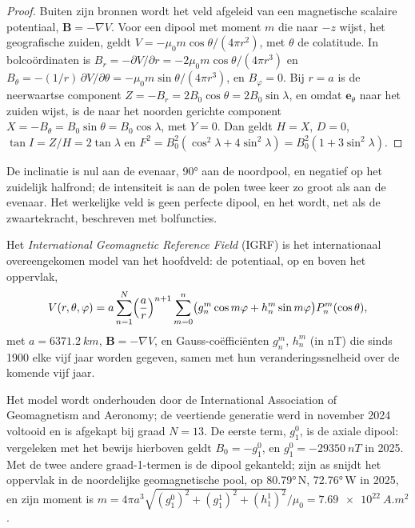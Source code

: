 \begin{proof}
Buiten zijn bronnen wordt het veld afgeleid van een magnetische scalaire potentiaal,
$\mathbf B = -\nabla V$. Voor een dipool met moment $m$ die naar $-z$ wijst, het
geografische zuiden, geldt $V = -\mu_0 m\cos\theta/(4\pi r^2)$, met $\theta$ de
colatitude. In bolcoördinaten is $B_r = -\partial V/\partial r =
-2\mu_0 m\cos\theta/(4\pi r^3)$ en $B_\theta = -(1/r)\,\partial V/\partial\theta =
-\mu_0 m\sin\theta/(4\pi r^3)$, en $B_\varphi = 0$. Bij $r = a$ is de neerwaartse
component $Z = -B_r = 2B_0\cos\theta = 2B_0\sin\lambda$, en omdat
$\mathbf e_\theta$ naar het zuiden wijst, is de naar het noorden gerichte component $X = -B_\theta =
B_0\sin\theta = B_0\cos\lambda$, met $Y = 0$. Dan geldt $H = X$, $D = 0$, $\tan I =
Z/H = 2\tan\lambda$ en $F^2 = B_0^2(\cos^2\lambda + 4\sin^2\lambda) =
B_0^2(1 + 3\sin^2\lambda)$.
\end{proof}

De inclinatie is nul aan de evenaar, \ang{90} aan de noordpool, en
negatief op het zuidelijk halfrond; de intensiteit is aan de polen
twee keer zo groot als aan de evenaar. Het werkelijke veld is geen
perfecte dipool, en het wordt, net als de zwaartekracht, beschreven met bolfuncties.

\begin{definition}\label{def:b3:palaeomagnetism:igrf}
Het \emph{International Geomagnetic Reference Field}
(IGRF) is het internationaal overeengekomen model van het
hoofdveld: de potentiaal, op en boven het oppervlak,
\[
  V(r,\theta,\varphi) = a\sum_{n=1}^{N}\Bigl(\frac ar\Bigr)^{n+1}\sum_{m=0}^{n}
  \bigl(g_n^m\cos m\varphi + h_n^m\sin m\varphi\bigr)P_n^m(\cos\theta),
\]
met $a = \qty{6371.2}{km}$, $\mathbf B = -\nabla V$, en Gauss-coëfficiënten
$g_n^m$, $h_n^m$ (in \unit{nT}) die sinds 1900 elke vijf jaar worden gegeven, samen
met hun veranderingssnelheid over de komende vijf jaar.
\end{definition}

Het model wordt onderhouden door de International Association of Geomagnetism and
Aeronomy; de veertiende generatie werd in november 2024 voltooid en is
afgekapt bij graad $N = 13$. De eerste term, $g_1^0$, is de axiale dipool:
vergeleken met het bewijs hierboven geldt $B_0 = -g_1^0$, en $g_1^0 = \qty{-29350}{nT}$
in 2025. Met de twee andere graad-1-termen is de dipool gekanteld; zijn as snijdt
het oppervlak in de noordelijke geomagnetische pool, op \ang{80.79}\,N, \ang{72.76}\,W in
2025, en zijn moment is $m = 4\pi a^3\sqrt{(g_1^0)^2 + (g_1^1)^2 +
(h_1^1)^2}/\mu_0 = \qty{7.69e22}{A.m^2}$.

